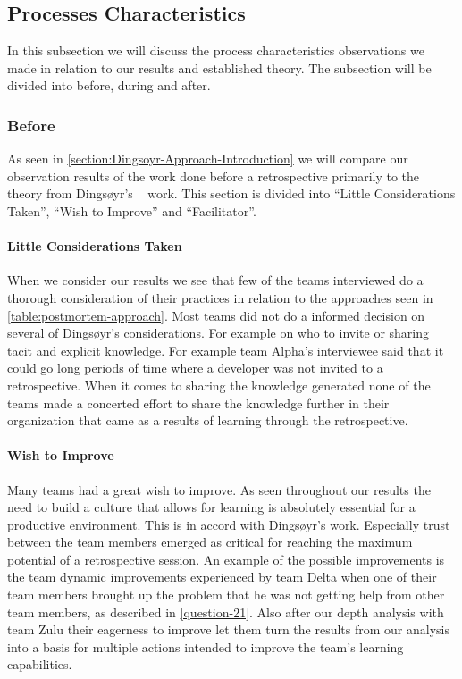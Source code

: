 \subsection{Processes Characteristics}
In this subsection we will discuss the process characteristics observations we made in relation to our results and established theory. The subsection will be divided into before, during and after.

\subsubsection{Before}
As seen in \autoref{section:Dingsoyr-Approach-Introduction} we will compare our observation results of the work done before a retrospective primarily to the theory from Dingsøyr's ~\cite{Dingsoyr2004} work. This section is divided into ``Little Considerations Taken'', ``Wish to Improve'' and ``Facilitator''.

\paragraph{Little Considerations Taken}
When we consider our results we see that few of the teams interviewed do a thorough consideration of their practices in relation to the approaches seen in \autoref{table:postmortem-approach}. Most teams did not do a informed decision on several of Dingsøyr's considerations. For example on who to invite or sharing tacit and explicit knowledge. For example team Alpha's interviewee said that it could go long periods of time where a developer was not invited to a retrospective. When it comes to sharing the knowledge generated none of the teams made a concerted effort to share the knowledge further in their organization that came as a results of learning through the retrospective.

\paragraph{Wish to Improve}
Many teams had a great wish to improve. As seen throughout our results the need to build a culture that allows for learning is absolutely essential for a productive environment. This is in accord with  Dingsøyr's work. Especially trust between the team members emerged as critical for reaching the maximum potential of a retrospective session. An example of the possible improvements is the team dynamic improvements experienced by team Delta when one of their team members brought up the problem that he was not getting help from other team members, as described in \autoref{question-21}. Also after our depth analysis with team Zulu their eagerness to improve let them turn the results from our analysis into a basis for multiple actions intended to improve the team's learning capabilities. 

